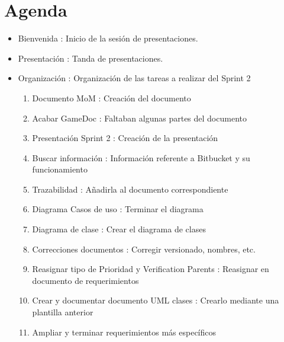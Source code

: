 \section{Agenda}

\begin{itemize}
\item Bienvenida : Inicio de la sesión de presentaciones.
\item Presentación : Tanda de presentaciones.
\item Organización : Organización de las tareas a realizar del Sprint 2
\begin{enumerate}
\item Documento MoM : Creación del documento
\item Acabar GameDoc : Faltaban algunas partes del documento
\item Presentación Sprint 2 : Creación de la presentación
\item Buscar información : Información referente a Bitbucket y su funcionamiento
\item Trazabilidad : Añadirla al documento correspondiente
\item Diagrama Casos de uso : Terminar el diagrama
\item Diagrama de clase : Crear el diagrama de clases
\item Correcciones documentos : Corregir versionado, nombres, etc.
\item Reasignar tipo de Prioridad y Verification Parents : Reasignar en documento de requerimientos
\item Crear y documentar documento UML clases : Crearlo mediante una plantilla anterior
\item Ampliar y terminar requerimientos más específicos
\end{enumerate}

\end{itemize}
